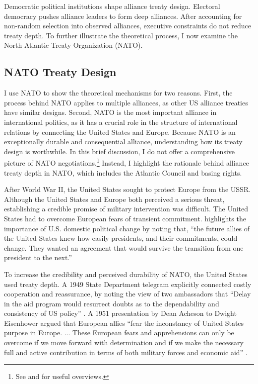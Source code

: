 \documentclass[12pt]{article}
\begin{document}
Democratic political institutions shape alliance treaty design. 
Electoral democracy pushes alliance leaders to form deep alliances. 
After accounting for non-random selection into observed alliances, executive constraints do not reduce treaty depth. 
To further illustrate the theoretical process, I now examine the North Atlantic Treaty Organization (NATO).



\subsection{NATO Treaty Design}


I use NATO to show the theoretical mechanisms for two reasons. 
First, the process behind NATO applies to multiple alliances, as other US alliance treaties have similar designs. 
Second, NATO is the most important alliance in international politics, as it has a crucial role in the structure of international relations by connecting the United States and Europe. 
Because NATO is an exceptionally durable and consequential alliance, understanding how its treaty design is worthwhile. 
In this brief discussion, I do not offer a comprehensive picture of NATO negotiations.\footnote{See \citet{Kaplan2007} and \citet{Poast2019a} for useful overviews.} 
Instead, I highlight the rationale behind alliance treaty depth in NATO, which includes the Atlantic Council and basing rights. 


After World War II, the United States sought to protect Europe from the USSR. 
Although the United States and Europe both perceived a serious threat, establishing a credible promise of military intervention was difficult. 
The United States had to overcome European fears of transient commitment.
\citet[pg. 14]{Sayle2019} highlights the importance of U.S. domestic political change by noting that, ``the future allies of the United States knew how easily presidents, and their commitments, could change. They wanted an agreement that would survive the transition from one president to the next.'' 


To increase the credibility and perceived durability of NATO, the United States used treaty depth.  
A 1949 State Department telegram explicitly connected costly cooperation and reassurance, by noting the view of two ambassadors that ``Delay in the aid program would resurrect doubts as to the dependability and consistency of US policy'' \citep{state-summary-0607-49}. 
A 1951 presentation by Dean Acheson to Dwight Eisenhower argued that European allies ``fear the inconstancy of United States purpose in Europe. ... These European fears and apprehensions can only be overcome if we move forward with determination and if we make the necessary full and active contribution in terms of both military forces and economic aid'' \citep[pg. 3]{Acheson1951}. 
\end{document}
